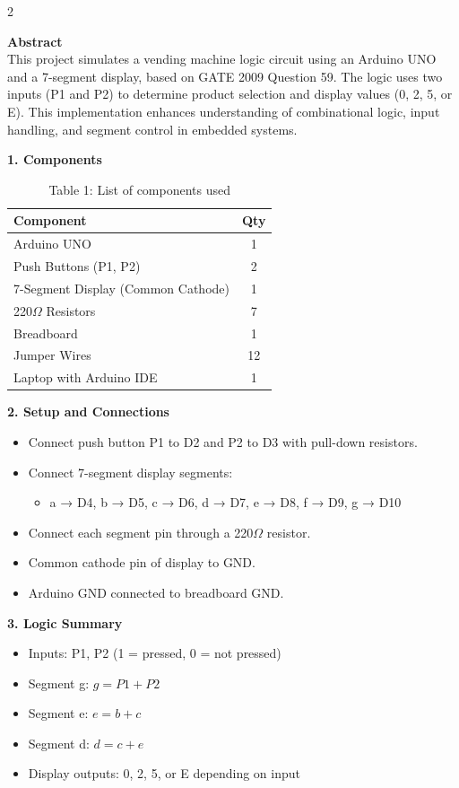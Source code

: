 \documentclass[12pt]{article}
\begin{document}
\begin{multicols}{2}

\noindent\textbf{Abstract} \\[0.5em]
This project simulates a vending machine logic circuit using an Arduino UNO and a 7-segment display, based on GATE 2009 Question 59. The logic uses two inputs (P1 and P2) to determine product selection and display values (0, 2, 5, or E). This implementation enhances understanding of combinational logic, input handling, and segment control in embedded systems.

\vspace{1em}
\noindent\textbf{1. Components}
\begin{table}[H]
\small
\centering
\begin{tabular}{|p{4.2cm}|c|}
\hline
\textbf{Component} & \textbf{Qty} \\
\hline
Arduino UNO & 1 \\
Push Buttons (P1, P2) & 2 \\
7-Segment Display (Common Cathode) & 1 \\
220$\Omega$ Resistors & 7 \\
Breadboard & 1 \\
Jumper Wires & 12 \\
Laptop with Arduino IDE & 1 \\
\hline
\end{tabular}
\caption*{Table 1: List of components used}
\end{table}

\vspace{1em}
\noindent\textbf{2. Setup and Connections}
\begin{itemize}
    \item Connect push button P1 to D2 and P2 to D3 with pull-down resistors.
    \item Connect 7-segment display segments:
    \begin{itemize}
        \item a → D4, b → D5, c → D6, d → D7, e → D8, f → D9, g → D10
    \end{itemize}
    \item Connect each segment pin through a 220$\Omega$ resistor.
    \item Common cathode pin of display to GND.
    \item Arduino GND connected to breadboard GND.
\end{itemize}

\vspace{1em}
\noindent\textbf{3. Logic Summary}
\begin{itemize}
    \item Inputs: P1, P2 (1 = pressed, 0 = not pressed)
    \item Segment g: $g = P1 + P2$
    \item Segment e: $e = b + c$
    \item Segment d: $d = c + e$
    \item Display outputs: 0, 2, 5, or E depending on input
\end{itemize}


\end{multicols}
\end{document}
